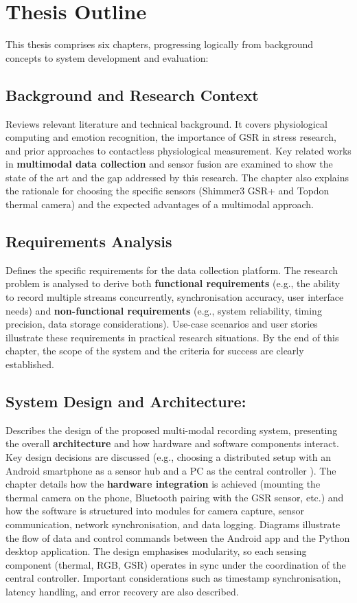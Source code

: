 \section{Thesis Outline}
This thesis comprises six chapters, progressing logically from background concepts to system development and evaluation:

\subsection{Background and Research Context} Reviews relevant literature and technical background. It covers physiological computing and emotion recognition, the importance of GSR in stress research, and prior approaches to contactless physiological measurement. Key related works in \textbf{multimodal data collection} and sensor fusion are examined to show the state of the art and the gap addressed by this research. The chapter also explains the rationale for choosing the specific sensors (Shimmer3 GSR+ and Topdon thermal camera) and the expected advantages of a multimodal approach.

\subsection{Requirements Analysis} Defines the specific requirements for the data collection platform. The research problem is analysed to derive both \textbf{functional requirements} (e.g., the ability to record multiple streams concurrently, synchronisation accuracy, user interface needs) and \textbf{non-functional requirements} (e.g., system reliability, timing precision, data storage considerations). Use-case scenarios and user stories illustrate these requirements in practical research situations. By the end of this chapter, the scope of the system and the criteria for success are clearly established.

\subsection{System Design and Architecture:} Describes the design of the proposed multi-modal recording system, presenting the overall \textbf{architecture} and how hardware and software components interact. Key design decisions are discussed (e.g., choosing a distributed setup with an Android smartphone as a sensor hub and a PC as the central controller \cite{ref9}). The chapter details how the \textbf{hardware integration} is achieved (mounting the thermal camera on the phone, Bluetooth pairing with the GSR sensor, etc.) and how the software is structured into modules for camera capture, sensor communication, network synchronisation, and data logging. Diagrams illustrate the flow of data and control commands between the Android app and the Python desktop application. The design emphasises modularity, so each sensing component (thermal, RGB, GSR) operates in sync under the coordination of the central controller. Important considerations such as timestamp synchronisation, latency handling, and error recovery are also described.


